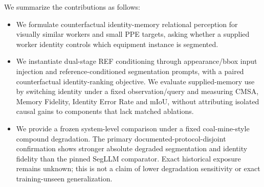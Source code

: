 We summarize the contributions as follows:
\begin{itemize}
\item We formulate counterfactual identity-memory relational perception for
visually similar workers and small PPE targets, asking whether a supplied
worker identity controls which equipment instance is segmented.
\item We instantiate dual-stage REF conditioning through appearance/bbox input
injection and reference-conditioned segmentation prompts, with a paired
counterfactual identity-ranking objective. We evaluate supplied-memory use by
switching identity under a fixed observation/query and measuring CMSA, Memory
Fidelity, Identity Error Rate and mIoU, without attributing isolated causal
gains to components that lack matched ablations.
\item We provide a frozen system-level comparison under a fixed coal-mine-style
compound degradation. The primary documented-protocol-disjoint confirmation
shows stronger absolute degraded segmentation and identity fidelity than the
pinned SegLLM comparator. Exact historical exposure remains unknown; this is
not a claim of lower degradation sensitivity or exact training-unseen
generalization.
\end{itemize}
